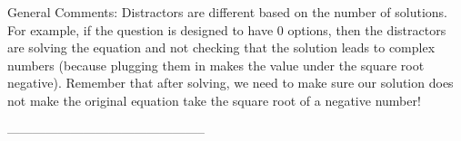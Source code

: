 \documentclass{article}[10pt]
\begin{document}
General Comments: Distractors are different based on the number of solutions. For example, if the question is designed to have 0 options, then the distractors are solving the equation and not checking that the solution leads to complex numbers (because plugging them in makes the value under the square root negative). Remember that after solving, we need to make sure our solution does not make the original equation take the square root of a negative number!

-----------------------------------------------
\end{document}
